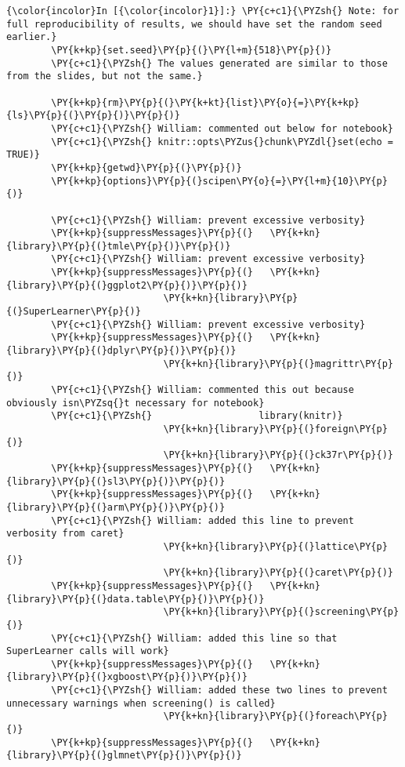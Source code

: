   \begin{Verbatim}[commandchars=\\\{\}]
{\color{incolor}In [{\color{incolor}1}]:} \PY{c+c1}{\PYZsh{} Note: for full reproducibility of results, we should have set the random seed earlier.}
        \PY{k+kp}{set.seed}\PY{p}{(}\PY{l+m}{518}\PY{p}{)}
        \PY{c+c1}{\PYZsh{} The values generated are similar to those from the slides, but not the same.}
        
        \PY{k+kp}{rm}\PY{p}{(}\PY{k+kt}{list}\PY{o}{=}\PY{k+kp}{ls}\PY{p}{(}\PY{p}{)}\PY{p}{)}
        \PY{c+c1}{\PYZsh{} William: commented out below for notebook}
        \PY{c+c1}{\PYZsh{} knitr::opts\PYZus{}chunk\PYZdl{}set(echo = TRUE)}
        \PY{k+kp}{getwd}\PY{p}{(}\PY{p}{)}
        \PY{k+kp}{options}\PY{p}{(}scipen\PY{o}{=}\PY{l+m}{10}\PY{p}{)}
        
        \PY{c+c1}{\PYZsh{} William: prevent excessive verbosity}
        \PY{k+kp}{suppressMessages}\PY{p}{(}   \PY{k+kn}{library}\PY{p}{(}tmle\PY{p}{)}\PY{p}{)}
        \PY{c+c1}{\PYZsh{} William: prevent excessive verbosity}
        \PY{k+kp}{suppressMessages}\PY{p}{(}   \PY{k+kn}{library}\PY{p}{(}ggplot2\PY{p}{)}\PY{p}{)}
                            \PY{k+kn}{library}\PY{p}{(}SuperLearner\PY{p}{)}
        \PY{c+c1}{\PYZsh{} William: prevent excessive verbosity}
        \PY{k+kp}{suppressMessages}\PY{p}{(}   \PY{k+kn}{library}\PY{p}{(}dplyr\PY{p}{)}\PY{p}{)}
                            \PY{k+kn}{library}\PY{p}{(}magrittr\PY{p}{)}
        \PY{c+c1}{\PYZsh{} William: commented this out because obviously isn\PYZsq{}t necessary for notebook}
        \PY{c+c1}{\PYZsh{}                   library(knitr)}
                            \PY{k+kn}{library}\PY{p}{(}foreign\PY{p}{)}
                            \PY{k+kn}{library}\PY{p}{(}ck37r\PY{p}{)}
        \PY{k+kp}{suppressMessages}\PY{p}{(}   \PY{k+kn}{library}\PY{p}{(}sl3\PY{p}{)}\PY{p}{)}
        \PY{k+kp}{suppressMessages}\PY{p}{(}   \PY{k+kn}{library}\PY{p}{(}arm\PY{p}{)}\PY{p}{)}
        \PY{c+c1}{\PYZsh{} William: added this line to prevent verbosity from caret}
                            \PY{k+kn}{library}\PY{p}{(}lattice\PY{p}{)}
                            \PY{k+kn}{library}\PY{p}{(}caret\PY{p}{)}
        \PY{k+kp}{suppressMessages}\PY{p}{(}   \PY{k+kn}{library}\PY{p}{(}data.table\PY{p}{)}\PY{p}{)}
                            \PY{k+kn}{library}\PY{p}{(}screening\PY{p}{)}
        \PY{c+c1}{\PYZsh{} William: added this line so that SuperLearner calls will work}
        \PY{k+kp}{suppressMessages}\PY{p}{(}   \PY{k+kn}{library}\PY{p}{(}xgboost\PY{p}{)}\PY{p}{)}
        \PY{c+c1}{\PYZsh{} William: added these two lines to prevent unnecessary warnings when screening() is called}
                            \PY{k+kn}{library}\PY{p}{(}foreach\PY{p}{)}
        \PY{k+kp}{suppressMessages}\PY{p}{(}   \PY{k+kn}{library}\PY{p}{(}glmnet\PY{p}{)}\PY{p}{)}
\end{Verbatim}
